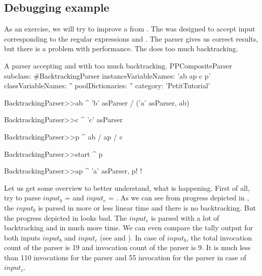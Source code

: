 \documentclass[a4paper,10pt,twoside]{book}
\begin{document}
\subsection{Debugging example}
  As an exercise, we will try to improve a  from . 
  The  was designed to accept input corresponding to the
  regular expressions  and .
  The parser gives us correct results, but there is a problem with performance.
  The  does too much backtracking.




\begin{script}{A parser accepting  and  with too much backtracking. \label{scr:pp/backtrackingParser}}
PPCompositeParser subclass: #BacktrackingParser
	instanceVariableNames: 'ab ap c p'
	classVariableNames: ''
	poolDictionaries: ''
	category: 'PetitTutorial'

BacktrackingParser>>ab
  ^  'b' asParser / 
     ('a' asParser, ab)

BacktrackingParser>>c
  ^ 'c' asParser

BacktrackingParser>>p
  ^ ab / ap / c

BacktrackingParser>>start
  ^ p


BacktrackingParser>>ap
  ^ 'a' asParser, p! !
\end{script}

Let us get some overview to better understand, what is happening.
First of all, try to parse $input_b$ =  and $input_c$ = .
As we can see from progress depicted in , the $input_b$ is parsed in more or less linear time and there is no backtracking.
But the progress depicted in  looks bad.
The $input_c$  is parsed with a lot of backtracking and in much more time.
We can even compare the tally output for both inputs $input_b$ and $input_c$ (see  and ).
In case of $input_b$, the total invocation count of the parser  is 19 and invocation count of the parser  is 9.
It is much less than 110 invocations for the parser  and 55 invocation for the parser  in case of $input_c$.
\end{document}
